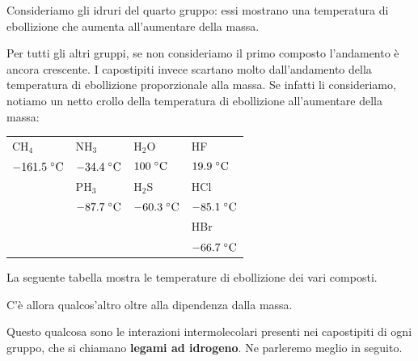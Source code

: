 Consideriamo gli idruri del quarto gruppo: essi mostrano una temperatura di ebollizione che aumenta all'aumentare della massa.

Per tutti gli altri gruppi, se non consideriamo il primo composto l'andamento è ancora crescente. I capostipiti invece scartano molto dall'andamento della temperatura di ebollizione proporzionale alla massa. Se infatti li consideriamo, notiamo un netto crollo della temperatura di ebollizione all'aumentare della massa:

\begin{center}
    \begin{tabular}{m{2cm}m{2cm}m{2cm}m{2cm}}
    CH$_4$ & NH$_3$ & H$_2$O & HF\\[0.8ex]
    \hspace{-0.4cm}$-161.5 \; ^{\circ} \rm C$ & \hspace{-0.3cm}$-34.4 \; ^{\circ} \rm C$ & \hspace{-0.2cm}$100 \; ^{\circ} \rm C$ & \hspace{-0.3cm}$19.9 \; ^{\circ} \rm C$\\[0.8ex]
    & PH$_3$ & H$_2$S & HCl\\[0.8ex]
    & \hspace{-0.3cm}$-87.7 \; ^{\circ} \rm C$ & \hspace{-0.3cm}$-60.3 \; ^{\circ} \rm C$ & \hspace{-0.3cm}$-85.1 \; ^{\circ} \rm C$\\[0.8ex]
    &&& HBr\\[0.8ex]
    &&& \hspace{-0.3cm}$-66.7 \; ^{\circ} \rm C$
    \end{tabular}
\end{center}

La seguente tabella mostra le temperature di ebollizione dei vari composti.

\vspace{0.2cm}C'è allora qualcos'altro oltre alla dipendenza dalla massa.

Questo qualcosa sono le interazioni intermolecolari presenti nei capostipiti di ogni gruppo, che si chiamano \textbf{legami ad idrogeno}. Ne parleremo meglio in seguito.

